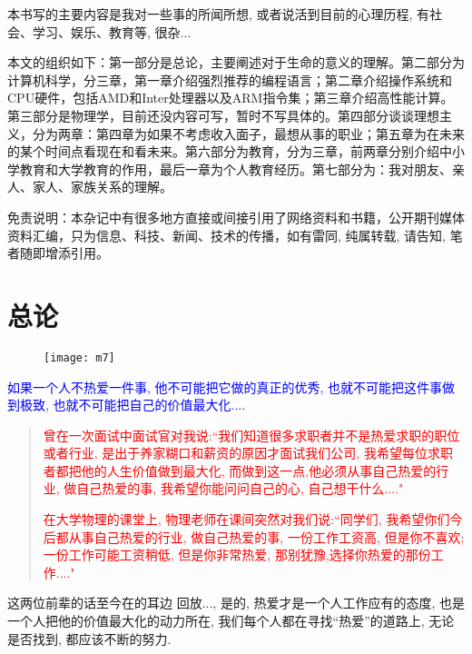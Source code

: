 \documentclass[utf8]{book}
\begin{document}
	本书写的主要内容是我对一些事的所闻所想, 或者说活到目前的心理历程, 有社会、学习、娱乐、教育等, 很杂...
	
	本文的组织如下：第一部分是总论，主要阐述对于生命的意义的理解。第二部分为计算机科学，分三章，第一章介绍强烈推荐的编程语言；第二章介绍操作系统和CPU硬件，包括AMD和Inter处理器以及ARM指令集；第三章介绍高性能计算。第三部分是物理学，目前还没内容可写，暂时不写具体的。第四部分谈谈理想主义，分为两章：第四章为如果不考虑收入面子，最想从事的职业；第五章为在未来的某个时间点看现在和看未来。第六部分为教育，分为三章，前两章分别介绍中小学教育和大学教育的作用，最后一章为个人教育经历。第七部分为：我对朋友、亲人、家人、家族关系的理解。
		
	免责说明：本杂记中有很多地方直接或间接引用了网络资料和书籍，公开期刊媒体资料汇编，只为信息、科技、新闻、技术的传播，如有雷同, 纯属转载, 请告知, 笔者随即增添引用。
    
    
    
\tableofcontents
\renewcommand\contentsname{目~录}


\mainmatter

\part{总论}

	\begin{figure}[H]
		\centering
		\texttt{[image: m7]}
	\end{figure}

	\textcolor{blue}{如果一个人不热爱一件事, 他不可能把它做的真正的优秀, 也就不可能把这件事做到极致, 也就不可能把自己的价值最大化....}
	\begin{quotation}
		\textcolor{red}{曾在一次面试中面试官对我说:``我们知道很多求职者并不是热爱求职的职位或者行业, 是出于养家糊口和薪资的原因才面试我们公司, 我希望每位求职者都把他的人生价值做到最大化, 而做到这一点,他必须从事自己热爱的行业, 做自己热爱的事, 我希望你能问问自己的心, 自己想干什么...."}
	
		\textcolor{red}{在大学物理的课堂上, 物理老师在课间突然对我们说:``同学们, 我希望你们今后都从事自己热爱的行业, 做自己热爱的事, 一份工作工资高, 但是你不喜欢; 一份工作可能工资稍低, 但是你非常热爱, 那别犹豫,选择你热爱的那份工作...."}
	\end{quotation}
	这两位前辈的话至今在的耳边 回放..., 是的, 热爱才是一个人工作应有的态度, 也是一个人把他的价值最大化的动力所在, 我们每个人都在寻找``热爱''的道路上, 无论是否找到, 都应该不断的努力.
\end{document}
